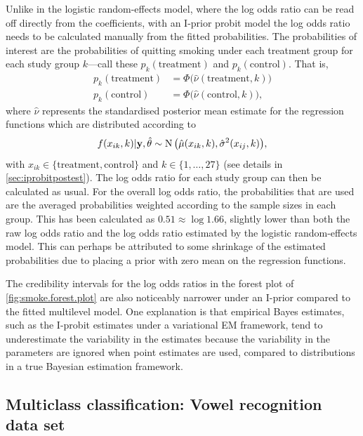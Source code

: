 \documentclass[showframe,11pt]{report}\usepackage[]{graphicx}\usepackage{xcolor}
\begin{document}
Unlike in the logistic random-effects model, where the log odds ratio can be read off directly from the coefficients, with an I-prior probit model the log odds ratio needs to be calculated manually from the fitted probabilities. 
The probabilities of interest are the probabilities of quitting smoking under each treatment group for each study group $k$---call these $p_k(\text{treatment})$ and $p_k(\text{control})$.
That is,
\begin{align*}
  p_k(\text{treatment}) &= \Phi\big( \hat\nu(\text{treatment}, k) \big) \\
  p_k(\text{control})   &= \Phi\big( \hat\nu(\text{control}, k) \big),
\end{align*}
where $\hat \nu$ represents the standardised posterior mean estimate for the regression functions which are distributed according to
\[
  f(x_{ik},k)|{\mathbf y},\hat\theta \sim \operatorname{N}\big(\hat\mu(x_{ik}, k), \hat\sigma^2(x_{ij}, k) \big),
\]
with $x_{ik}\in\{\text{treatment}, \text{control} \}$ and $k \in \{1,\dots,27\}$  (see details in \cref{sec:iprobitpostest}).
The log odds ratio for each study group can then be calculated as usual.
For the overall log odds ratio, the probabilities that are used are the averaged probabilities weighted according to the sample sizes in each group.
This has been calculated as $0.51 \approx \log 1.66$, slightly lower than both the raw log odds ratio and the log odds ratio estimated by the logistic random-effects model.
This can perhaps be attributed to some shrinkage of the estimated probabilities due to placing a prior with zero mean on the regression functions.

The credibility intervals for the log odds ratios in the forest plot of \cref{fig:smoke.forest.plot} are also noticeably narrower under an I-prior compared to the fitted multilevel model.
One explanation is that empirical Bayes estimates, such as the I-probit estimates under a variational EM framework, tend to underestimate the variability in the estimates because the variability in the parameters are ignored when point estimates are used, compared to distributions in a true Bayesian estimation framework.

\subsection{Multiclass classification: Vowel recognition data set}
\end{document}
